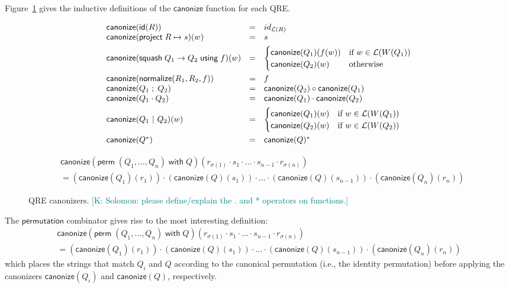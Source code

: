 \documentclass[acmsmall,review,anonymous]{acmart}
\newcommand{\FINISH}[3]{\ifdraft\textcolor{#1}{[#2: #3]}\fi}
\newcommand{\ksf}[1]{\FINISH{teal}{K}{#1}}
\newcommand{\codefont}[1]{\ensuremath{\mathsf{#1}}}
\newcommand{\kw}[1]{\codefont{#1}}
\newcommand{\project}[2]{\ensuremath{\kw{project} \; #1 \mapsto #2}}
\newcommand{\squash}[3]{\ensuremath{\kw{squash} \; #1 \rightarrow #2\; \kw{using} \; #3}}
\newcommand{\perm}[2]{\ensuremath{\kw{perm}\; (#1)\; \kw{with}\; #2}}
\newcommand{\normalize}[3]{\ensuremath{\kw{normalize}(#1, #2, #3)}}
\newcommand{\sep}{\ensuremath{\ | \ }}
\newcommand{\canonize}{\ensuremath{\kw{canonize}}}
\newcommand{\id}{\ensuremath{\kw{id}}}
\begin{document}
Figure~\ref{fig:canonizers} gives the inductive definitions of the
$\canonize{}$ function for each QRE.
\begin{figure}[t]
\begin{center}
\[
\begin{array}{l@\quad l @\quad l}
\canonize(\id(R)) &=& id_{\mathcal{L}(R)} \\
\canonize(\project{R}{s})(w) &=& s\\[1ex]
\canonize(\squash{Q_1}{Q_2}{f})(w) &=&
\begin{cases}
\canonize(Q_1)(f(w)) & \text{if } w \in \mathcal{L}(W(Q_1))\\
\canonize(Q_2)(w) & \text{otherwise}
\end{cases}\\[3ex]
\canonize(\normalize{R_1}{R_2}{f}) &=& f\\
\canonize(Q_1 \; ; \; Q_2) &=& \canonize(Q_2) \circ \canonize(Q_1)\\
\canonize(Q_1 \cdot Q_2) &=& \canonize(Q_1) \cdot \canonize(Q_2)\\[1ex]
\canonize(Q_1 \sep Q_2)(w) &=&
\begin{cases}
\canonize(Q_1)(w) & \text{if } w \in \mathcal{L}(W(Q_1))\\
\canonize(Q_2)(w) & \text{if } w \in \mathcal{L}(W(Q_2))\\
\end{cases}\\[3ex]
\canonize(Q^*) &=& \canonize(Q)^* \\
\end{array}
\]
\end{center}
\begin{align*}
&\canonize(\perm{Q_1, \ldots, Q_n}{Q})(r_{\sigma(1)}
\cdot s_1 \cdot \ldots \cdot s_{n-1} \cdot r_{\sigma(n)})\\
&= (\canonize(Q_1)(r_1)) \cdot (\canonize(Q)(s_1)) \cdot \ldots \cdot
(\canonize(Q)(s_{n-1}))\cdot
(\canonize(Q_n)(r_n))
\end{align*}
\caption{QRE canonizers. \ksf{Solomon: please define/explain the . and *
operators on functions.}}
\label{fig:canonizers}
\end{figure}
The \kw{permutation} combinator gives rise to the most interesting
definition:
\begin{align*}\canonize(\perm{Q_1, \ldots, Q_n}{Q})(r_{\sigma(1)}
\cdot s_1 \cdot \ldots \cdot s_{n-1} \cdot r_{\sigma(n)}) \\
= (\canonize(Q_1)(r_1)) \cdot (\canonize(Q)(s_1)) \cdot \ldots \cdot
(\canonize(Q)(s_{n-1}))\cdot
(\canonize(Q_n)(r_n))
\end{align*}
\noindent 
which places the strings that match $Q_i$ and $Q$ according to the
canonical permutation (i.e., the identity permutation) before applying
the canonizers $\canonize(Q_i)$ and $\canonize(Q)$, respectively.
\end{document}
